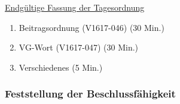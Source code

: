 \documentclass[ngerman,headheight=70pt]{scrartcl}
\begin{document}
    \newpage
    \underline{Endgültige Fassung der Tagesordnung}
    \begin{enumerate}[label={\textbf{Top \theenumi}},leftmargin=*]
        \item Beitragsordnung (V1617-046) (30 Min.)
        \item VG-Wort (V1617-047) (30 Min.)
        \item Verschiedenes (5 Min.)
    \end{enumerate}

    \subsubsection{Feststellung der Beschlussfähigkeit}
\end{document}
